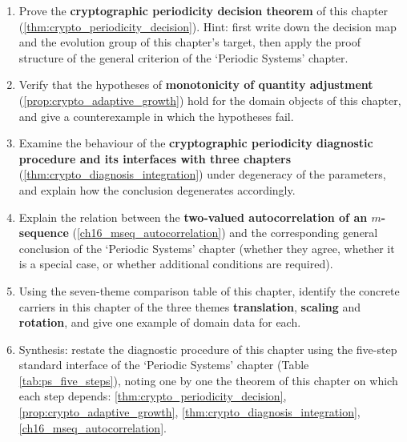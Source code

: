 \begin{enumerate}[leftmargin=3em, label=\textbf{Exercise \arabic*}]
    \item Prove the \textbf{cryptographic periodicity decision theorem} of this chapter (\ref{thm:crypto_periodicity_decision}). Hint: first write down the decision map and the evolution group of this chapter's target, then apply the proof structure of the general criterion of the `Periodic Systems' chapter.

    \item Verify that the hypotheses of \textbf{monotonicity of quantity adjustment} (\ref{prop:crypto_adaptive_growth}) hold for the domain objects of this chapter, and give a counterexample in which the hypotheses fail.

    \item Examine the behaviour of the \textbf{cryptographic periodicity diagnostic procedure and its interfaces with three chapters} (\ref{thm:crypto_diagnosis_integration}) under degeneracy of the parameters, and explain how the conclusion degenerates accordingly.

    \item Explain the relation between the \textbf{two-valued autocorrelation of an \(m\)-sequence} (\ref{ch16_mseq_autocorrelation}) and the corresponding general conclusion of the `Periodic Systems' chapter (whether they agree, whether it is a special case, or whether additional conditions are required).

    \item Using the seven-theme comparison table of this chapter, identify the concrete carriers in this chapter of the three themes \textbf{translation}, \textbf{scaling} and \textbf{rotation}, and give one example of domain data for each.

    \item Synthesis: restate the diagnostic procedure of this chapter using the five-step standard interface of the `Periodic Systems' chapter (Table \ref{tab:ps_five_steps}), noting one by one the theorem of this chapter on which each step depends: \ref{thm:crypto_periodicity_decision}, \ref{prop:crypto_adaptive_growth}, \ref{thm:crypto_diagnosis_integration}, \ref{ch16_mseq_autocorrelation}.
\end{enumerate}


